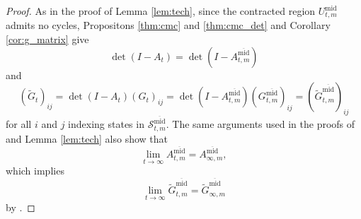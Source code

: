 \documentclass[10pt,a4paper]{amsart}
\begin{document}
\begin{proof}
		As in the proof of Lemma \ref{lem:tech}, since the contracted region $U^\text{mid}_{t,m}$ admits no cycles, Propositons \ref{thm:cmc} and \ref{thm:cmc_det} and Corollary \ref{cor:g_matrix} give
		$$
		\det(I - A_t) = \det(I - A^{\overline{\text{mid}}}_{t,m})
		$$
		and
		$$
		(\widetilde{G}_t)_{ij} = \det(I - A_t)(G_t)_{ij} = \det(I - A^{\overline{\text{mid}}}_{t,m})(G^{\overline{\text{mid}}}_{t,m})_{ij} = (\widetilde{G}^{\overline{\text{mid}}}_{t,m})_{ij}
		$$
		for all $i$ and $j$ indexing states in $\mathcal{S}_{t,m}^{\overline{\text{mid}}}$. The same arguments used in the proofs of  and Lemma \ref{lem:tech} also show that
		\begin{equation}
			\label{eq:final_stab}
			\lim_{t \to \infty} A^{\overline{\text{mid}}}_{t,m} = A^{\overline{\text{mid}}}_{\infty,m},
		\end{equation}
		which implies 
		$$
		\lim_{t \to \infty} \widetilde{G}^{\overline{\text{mid}}}_{t,m} = \widetilde{G}^{\overline{\text{mid}}}_{\infty,m}
		$$
		by .
		

\end{proof}
\end{document}
